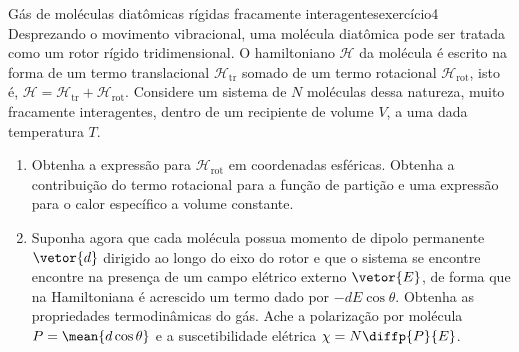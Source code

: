 \begin{exercício}{Gás de moléculas diatômicas rígidas fracamente interagentes}{exercício4}
    Desprezando o movimento vibracional, uma molécula diatômica pode ser tratada como um rotor rígido tridimensional. O hamiltoniano \(\mathcal{H}\) da molécula é escrito na forma de um termo translacional \(\mathcal{H}_{\mathrm{tr}}\) somado de um termo rotacional \(\mathcal{H}_{\mathrm{rot}}\), isto é, \(\mathcal{H}=\mathcal{H}_{\mathrm{tr}} + \mathcal{H}_{\mathrm{rot}}\). Considere um sistema de \(N\) moléculas dessa natureza, muito fracamente interagentes, dentro de um recipiente de volume \(V\), a uma dada temperatura \(T\).
    \begin{enumerate}[label=(\alph*)]
        \item Obtenha a expressão para \(\mathcal{H}_{\mathrm{rot}}\) em coordenadas esféricas. Obtenha a contribuição do termo rotacional para a função de partição e uma expressão para o calor específico a volume constante.
        \item Suponha agora que cada molécula possua momento de dipolo permanente \(\vetor{d}\) dirigido ao longo do eixo do rotor e que o sistema se encontre encontre na presença de um campo elétrico externo \(\vetor{E}\), de forma que na Hamiltoniana é acrescido um termo dado por \(-d E \cos\theta\). Obtenha as propriedades termodinâmicas do gás. Ache a polarização por molécula \(P = \mean{d \cos\theta}\) e a suscetibilidade elétrica \(\chi = N\diffp{P}{E}\).
    \end{enumerate}
\end{exercício}

